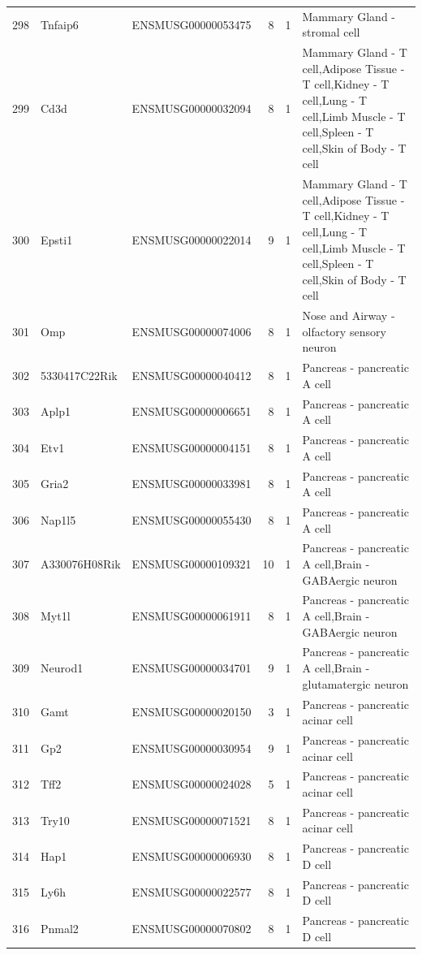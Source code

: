 \begin{table}[ht]
{\begin{tabular}{lllrrl}
        298 & Tnfaip6 & ENSMUSG00000053475 & 8 & 1 & Mammary Gland - stromal cell \\
        299 & Cd3d & ENSMUSG00000032094 & 8 & 1 & Mammary Gland - T cell,Adipose Tissue - T cell,Kidney - T cell,Lung - T cell,Limb Muscle - T cell,Spleen - T cell,Skin of Body - T cell \\
        300 & Epsti1 & ENSMUSG00000022014 & 9 & 1 & Mammary Gland - T cell,Adipose Tissue - T cell,Kidney - T cell,Lung - T cell,Limb Muscle - T cell,Spleen - T cell,Skin of Body - T cell \\
        301 & Omp & ENSMUSG00000074006 & 8 & 1 & Nose and Airway - olfactory sensory neuron \\
        302 & 5330417C22Rik & ENSMUSG00000040412 & 8 & 1 & Pancreas - pancreatic A cell \\
        303 & Aplp1 & ENSMUSG00000006651 & 8 & 1 & Pancreas - pancreatic A cell \\
        304 & Etv1 & ENSMUSG00000004151 & 8 & 1 & Pancreas - pancreatic A cell \\
        305 & Gria2 & ENSMUSG00000033981 & 8 & 1 & Pancreas - pancreatic A cell \\
        306 & Nap1l5 & ENSMUSG00000055430 & 8 & 1 & Pancreas - pancreatic A cell \\
        307 & A330076H08Rik & ENSMUSG00000109321 & 10 & 1 & Pancreas - pancreatic A cell,Brain - GABAergic neuron \\
        308 & Myt1l & ENSMUSG00000061911 & 8 & 1 & Pancreas - pancreatic A cell,Brain - GABAergic neuron \\
        309 & Neurod1 & ENSMUSG00000034701 & 9 & 1 & Pancreas - pancreatic A cell,Brain - glutamatergic neuron \\
        310 & Gamt & ENSMUSG00000020150 & 3 & 1 & Pancreas - pancreatic acinar cell \\
        311 & Gp2 & ENSMUSG00000030954 & 9 & 1 & Pancreas - pancreatic acinar cell \\
        312 & Tff2 & ENSMUSG00000024028 & 5 & 1 & Pancreas - pancreatic acinar cell \\
        313 & Try10 & ENSMUSG00000071521 & 8 & 1 & Pancreas - pancreatic acinar cell \\
        314 & Hap1 & ENSMUSG00000006930 & 8 & 1 & Pancreas - pancreatic D cell \\
        315 & Ly6h & ENSMUSG00000022577 & 8 & 1 & Pancreas - pancreatic D cell \\
        316 & Pnmal2 & ENSMUSG00000070802 & 8 & 1 & Pancreas - pancreatic D cell \\

\end{tabular}}
\end{table}
